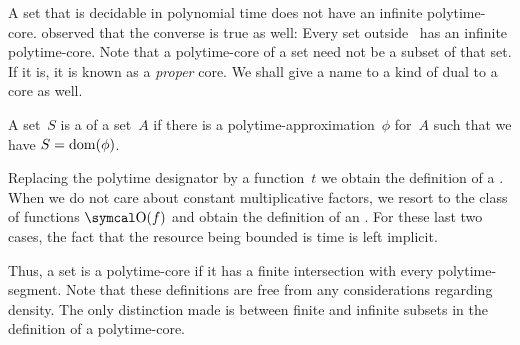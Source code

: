 A set that is decidable in polynomial time does not have an infinite polytime-core.
\textcite{lynch1975reducibility} observed that the converse is true as well:
Every set outside~ has an infinite polytime-core.
Note that a polytime-core of a set need not be a subset of that set.
If it is, it is known as a \emph{proper} core.
We shall give a name to a kind of dual to a core as well.
\begin{definition}
  A set~$S$ is a  of a set~$A$ if there is a polytime-approximation~$\phi$ for~$A$ such that we have $S = \operatorname{dom}(\phi)$.

  Replacing the polytime designator by a function~$t$ we obtain the definition of a .
  When we do not care about constant multiplicative factors, we resort to the class of functions $\bigO(f)$ and obtain the definition of an .
  For these last two cases, the fact that the resource being bounded is time is left implicit.
\end{definition}
Thus, a set is a polytime-core if it has a finite intersection with every polytime-segment.
Note that these definitions are free from any considerations regarding density.
The only distinction made is between finite and infinite subsets in the definition of a polytime-core.

